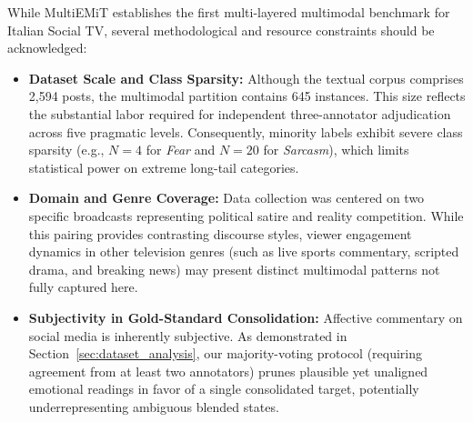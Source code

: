 While MultiEMiT establishes the first multi-layered multimodal benchmark for Italian Social TV, several methodological and resource constraints should be acknowledged:
\begin{itemize}
    \item \textbf{Dataset Scale and Class Sparsity:} Although the textual corpus comprises 2,594 posts, the multimodal partition contains 645 instances. This size reflects the substantial labor required for independent three-annotator adjudication across five pragmatic levels. Consequently, minority labels exhibit severe class sparsity (e.g., $N=4$ for \textit{Fear} and $N=20$ for \textit{Sarcasm}), which limits statistical power on extreme long-tail categories.
    \item \textbf{Domain and Genre Coverage:} Data collection was centered on two specific broadcasts representing political satire and reality competition. While this pairing provides contrasting discourse styles, viewer engagement dynamics in other television genres (such as live sports commentary, scripted drama, and breaking news) may present distinct multimodal patterns not fully captured here.
    \item \textbf{Subjectivity in Gold-Standard Consolidation:} Affective commentary on social media is inherently subjective. As demonstrated in Section~\ref{sec:dataset_analysis}, our majority-voting protocol (requiring agreement from at least two annotators) prunes plausible yet unaligned emotional readings in favor of a single consolidated target, potentially underrepresenting ambiguous blended states.
\end{itemize}
